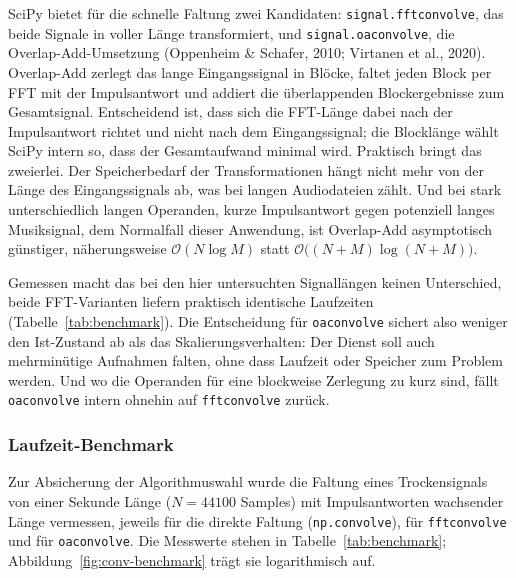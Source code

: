 SciPy bietet für die schnelle Faltung zwei Kandidaten:
\texttt{signal.fftconvolve}, das beide Signale in voller Länge transformiert,
und \texttt{signal.oaconvolve}, die Overlap-Add-Umsetzung (Oppenheim \&
Schafer, 2010; Virtanen et al., 2020). Overlap-Add zerlegt das lange
Eingangssignal in Blöcke, faltet jeden Block per FFT mit der Impulsantwort und
addiert die überlappenden Blockergebnisse zum Gesamtsignal. Entscheidend ist,
dass sich die FFT-Länge dabei nach der Impulsantwort richtet und nicht nach dem
Eingangssignal; die Blocklänge wählt SciPy intern so, dass der Gesamtaufwand
minimal wird. Praktisch bringt das zweierlei. Der Speicherbedarf der
Transformationen hängt nicht mehr von der Länge des Eingangssignals ab, was
bei langen Audiodateien zählt. Und bei stark unterschiedlich langen Operanden,
kurze Impulsantwort gegen potenziell langes Musiksignal, dem Normalfall dieser
Anwendung, ist Overlap-Add asymptotisch günstiger, näherungsweise
$\mathcal{O}(N \log M)$ statt $\mathcal{O}\bigl((N+M)\log(N+M)\bigr)$.

Gemessen macht das bei den hier untersuchten Signallängen keinen Unterschied,
beide FFT-Varianten liefern praktisch identische Laufzeiten
(Tabelle~\ref{tab:benchmark}). Die Entscheidung für \texttt{oaconvolve}
sichert also weniger den Ist-Zustand ab als das Skalierungsverhalten: Der
Dienst soll auch mehrminütige Aufnahmen falten, ohne dass Laufzeit oder
Speicher zum Problem werden. Und wo die Operanden für eine blockweise
Zerlegung zu kurz sind, fällt \texttt{oaconvolve} intern ohnehin auf
\texttt{fftconvolve} zurück.

\subsubsection{Laufzeit-Benchmark}
\label{subsubsec:benchmark}

Zur Absicherung der Algorithmuswahl wurde die Faltung eines Trockensignals
von einer Sekunde Länge ($N = 44100$ Samples) mit Impulsantworten wachsender
Länge vermessen, jeweils für die direkte Faltung (\texttt{np.convolve}), für
\texttt{fftconvolve} und für \texttt{oaconvolve}. Die Messwerte stehen in
Tabelle~\ref{tab:benchmark}; Abbildung~\ref{fig:conv-benchmark} trägt sie
logarithmisch auf.

